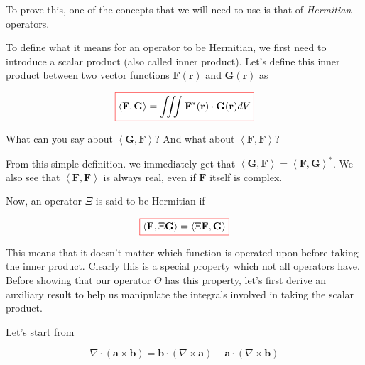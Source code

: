To prove this, one of the concepts that we will need to use is that of \emph{Hermitian} operators.




\noindent{}To define what it means for an operator to be Hermitian, we first need to introduce a scalar product (also called inner product). Let's define this inner product between two vector functions ${\mathbf F({\mathbf r})}$ and ${\mathbf G({\mathbf r})}$ as

\begin{equation}
\fbox{$\displaystyle
\left\langle {\mathbf F}, {\mathbf G}\right\rangle = \iiint {\mathbf F^*({\mathbf r})} \cdot {\mathbf G({\mathbf r})} dV
$}
\end{equation} 

\begin{cue}
What can you say about $\left\langle {\mathbf G}, {\mathbf F}\right\rangle$? And what about $\left\langle {\mathbf F}, {\mathbf F}\right\rangle$? 
\end{cue}

From this simple definition. we immediately get that $\left\langle {\mathbf G}, {\mathbf F}\right\rangle = \left\langle {\mathbf F}, {\mathbf G}\right\rangle ^*$. We also see that $\left\langle {\mathbf F}, {\mathbf F}\right\rangle$ is always real, even if ${\mathbf F}$ itself is complex.

Now, an operator $\Xi$ is said to be Hermitian if

\begin{equation}
\fbox{$\displaystyle
\left\langle {\mathbf F}, \Xi {\mathbf G}\right\rangle = \left\langle \Xi {\mathbf F}, {\mathbf G}\right\rangle
$}
\end{equation} 

This means that it doesn't matter which function is operated upon before taking the inner product. Clearly this is a special property which not all operators have. Before showing that our operator $\Theta$ has this property, let's first derive an auxiliary result to help us manipulate the integrals involved in taking the scalar product. 

Let's start from

\begin{equation}
\nabla \cdot ({\mathbf a} \times {\mathbf b}) = {\mathbf b} \cdot ( \nabla \times {\mathbf a}) - {\mathbf a}  \cdot (\nabla \times {\mathbf b})
\end{equation} 

